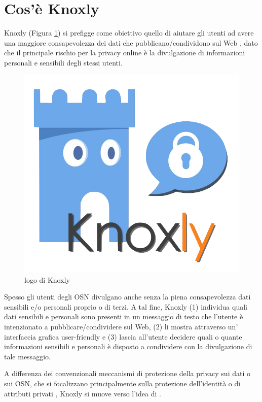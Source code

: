 \section{Cos'è Knoxly}
\label{sec:whoisKnoxly}
Knoxly (Figura \ref{fig:logoKnoxly}) si prefigge come obiettivo quello di aiutare gli utenti ad avere una maggiore consapevolezza
dei dati che pubblicano/condividono sul Web , dato che il principale rischio per la privacy online è la divulgazione di
informazioni personali e sensibili degli stessi utenti.\newline
\begin{figure}[h]
    \centering
    \includegraphics[scale=0.25]{Figure/logoKnoxly.png}
    \caption{logo di Knoxly}
    \label{fig:logoKnoxly}
\end{figure}
\FloatBarrier
Spesso gli utenti degli OSN divulgano anche senza la piena consapevolezza dati sensibili e/o personali proprio o di terzi. A tal fine, Knoxly (1) individua quali dati sensibili e personali sono presenti in un messaggio di testo che l’utente è intenzionato a pubblicare/condividere sul Web, (2) li mostra attraverso un’ interfaccia grafica user-friendly e (3) lascia all’utente decidere quali o quante informazioni sensibili e personali è disposto a condividere con la divulgazione di tale messaggio.

A differenza dei convenzionali meccanismi di protezione della privacy sui dati o sui OSN, che si focalizzano principalmente sulla protezione dell’identità o di attributi privati \cite{collective-data, diff-privacy, urwho, inferr-privacy, protection-private, stalking}, Knoxly si muove verso l’idea di .

